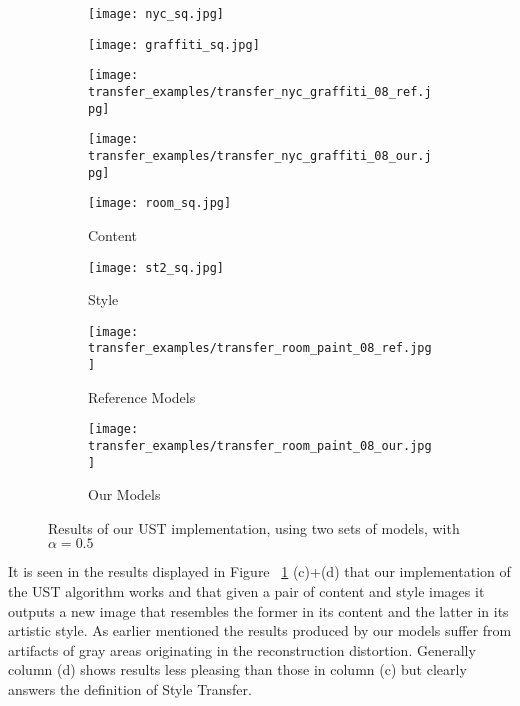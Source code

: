 \begin{figure}[H]
	\centering
	\begin{subfigure}[b]{0.225\linewidth}
		\texttt{[image: nyc\_sq.jpg]} %
	\end{subfigure}
	\begin{subfigure}[b]{0.225\linewidth}
		\texttt{[image: graffiti\_sq.jpg]} %
	\end{subfigure}
	\begin{subfigure}[b]{0.225\linewidth}
		\texttt{[image: transfer\_examples/transfer\_nyc\_graffiti\_08\_ref.jpg]} %
	\end{subfigure}
	\begin{subfigure}[b]{0.225\linewidth}
		\texttt{[image: transfer\_examples/transfer\_nyc\_graffiti\_08\_our.jpg]} %
	\end{subfigure}
	\centering
	\begin{subfigure}[b]{0.225\linewidth}
		\texttt{[image: room\_sq.jpg]} %
		\caption{Content}
	\end{subfigure}
	\begin{subfigure}[b]{0.225\linewidth}
		\texttt{[image: st2\_sq.jpg]} %
		\caption{Style}
	\end{subfigure}
	\begin{subfigure}[b]{0.225\linewidth}
		\texttt{[image: transfer\_examples/transfer\_room\_paint\_08\_ref.jpg]} %
		\caption{Reference Models}
	\end{subfigure}
	\begin{subfigure}[b]{0.225\linewidth}
		\texttt{[image: transfer\_examples/transfer\_room\_paint\_08\_our.jpg]} %
		\caption{Our Models}
	\end{subfigure}
	\caption{Results of our UST implementation, using two sets of models, with $\alpha=0.5$}
	\label{fig:style_transfer}
\end{figure}

It is seen in the results displayed in Figure ~\ref{fig:style_transfer} (c)+(d) that our implementation of the UST algorithm works and that given a pair of content and style images it outputs a new image that resembles the former in its content and the latter in its artistic style. As earlier mentioned the results produced by our models suffer from artifacts of gray areas originating in the reconstruction distortion. Generally column (d) shows results less pleasing than those in column (c) but clearly answers the definition of Style Transfer. \\

